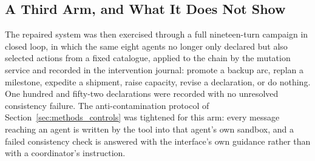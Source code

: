 \subsection{A Third Arm, and What It Does Not Show}

The repaired system was then exercised through a full nineteen-turn campaign in closed loop,
in which the same eight agents no longer only declared but also selected actions from a fixed
catalogue, applied to the chain by the mutation service and recorded in the intervention
journal: promote a backup arc, replan a milestone, expedite a shipment, raise capacity, revise
a declaration, or do nothing. One hundred and fifty-two declarations were recorded with no
unresolved consistency failure. The anti-contamination protocol of
Section~\ref{sec:methods_controls} was tightened for this arm: every message reaching an agent
is written by the tool into that agent's own sandbox, and a failed consistency check is
answered with the interface's own guidance rather than with a coordinator's instruction.

